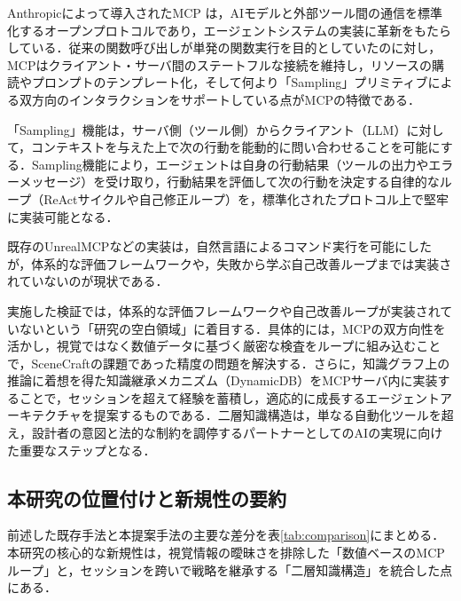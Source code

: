 \documentclass[dvipdfmx, a4paper, 9pt]{deimj}
\begin{document}
Anthropicによって導入されたMCP\cite{anthropic2024mcp} は，AIモデルと外部ツール間の通信を標準化するオープンプロトコルであり，エージェントシステムの実装に革新をもたらしている．従来の関数呼び出しが単発の関数実行を目的としていたのに対し\cite{schick2024toolformer}，MCPはクライアント・サーバ間のステートフルな接続を維持し，リソースの購読やプロンプトのテンプレート化，そして何より「Sampling」プリミティブによる双方向のインタラクションをサポートしている点がMCPの特徴である．

「Sampling」機能は，サーバ側（ツール側）からクライアント（LLM）に対して，コンテキストを与えた上で次の行動を能動的に問い合わせることを可能にする．Sampling機能により，エージェントは自身の行動結果（ツールの出力やエラーメッセージ）を受け取り，行動結果を評価して次の行動を決定する自律的なループ（ReActサイクル\cite{yao2023react}や自己修正ループ\cite{shinn2024reflexion,xi2023rise}）を，標準化されたプロトコル上で堅牢に実装可能となる．

既存のUnrealMCP\cite{unrealmcp2024}などの実装は，自然言語によるコマンド実行を可能にしたが，体系的な評価フレームワークや，失敗から学ぶ自己改善ループまでは実装されていないのが現状である．

実施した検証では，体系的な評価フレームワークや自己改善ループが実装されていないという「研究の空白領域」に着目する．具体的には，MCPの双方向性を活かし，視覚ではなく数値データに基づく厳密な検査をループに組み込むことで，SceneCraftの課題であった精度の問題を解決する．さらに，知識グラフ上の推論に着想を得た知識継承メカニズム（DynamicDB）をMCPサーバ内に実装することで，セッションを超えて経験を蓄積し，適応的に成長するエージェントアーキテクチャを提案するものである．二層知識構造は，単なる自動化ツールを超え，設計者の意図と法的な制約を調停するパートナーとしてのAIの実現に向けた重要なステップとなる．

\subsection{本研究の位置付けと新規性の要約}

前述した既存手法と本提案手法の主要な差分を表\ref{tab:comparison}にまとめる．本研究の核心的な新規性は，視覚情報の曖昧さを排除した「数値ベースのMCPループ」と，セッションを跨いで戦略を継承する「二層知識構造」を統合した点にある．
\end{document}
